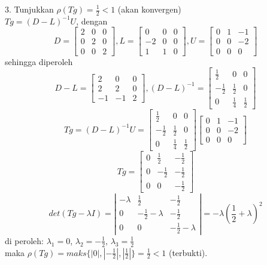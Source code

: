 \documentclass[paper=a4, fontsize=11pt]{scrartcl}
\numberwithin{equation}{section} %
\numberwithin{figure}{section} %
\numberwithin{table}{section} %
\begin{document}
3. Tunjukkan $\rho(Tg) = \frac{1}{2} < 1$ (akan konvergen)\\
$Tg = (D-L)^{-1}U$, dengan\\
\[ 
D = 
\begin{bmatrix}
  2 & 0 & 0 \\
  0 & 2 & 0 \\
  0 & 0 & 2
 \end{bmatrix}
,
L = 
\begin{bmatrix}
  0 & 0 & 0 \\
 -2 & 0 & 0 \\
  1 & 1 & 0
 \end{bmatrix}
, 
U = 
\begin{bmatrix}
  0 & 1 & -1 \\
  0 & 0 & -2 \\
  0 & 0 &  0
 \end{bmatrix}
\]
sehingga diperoleh
\[
D-L =
\begin{bmatrix}
  2 & 0 & 0 \\
  2 & 2 & 0 \\
  -1 & -1 & 2
 \end{bmatrix}
,
(D-L)^{-1} =
\begin{bmatrix}
  \frac{1}{2} & 0 & 0 \\
  -\frac{1}{2} & \frac{1}{2} & 0 \\
  0 & \frac{1}{4} & \frac{1}{2}
 \end{bmatrix}
\]
\[
Tg = (D-L)^{-1}U = 
\begin{bmatrix}
  \frac{1}{2} & 0 & 0 \\
  -\frac{1}{2} & \frac{1}{2} & 0 \\
  0 & \frac{1}{4} & \frac{1}{2}
 \end{bmatrix}
\begin{bmatrix}
  0 & 1 & -1 \\
  0 & 0 & -2 \\
  0 & 0 &  0
 \end{bmatrix}
\]
\[
Tg = 
\begin{bmatrix}
  0 & \frac{1}{2} & -\frac{1}{2} \\
  0 & -\frac{1}{2} & -\frac{1}{2} \\
  0 & 0 & -\frac{1}{2}
\end{bmatrix}
\]
\[
det(Tg - \lambda I) =
\left| 
\begin{array}{ccc}
  -\lambda & \frac{1}{2} & -\frac{1}{2} \\
  0 & -\frac{1}{2}-\lambda & -\frac{1}{2} \\
  0 & 0 & -\frac{1}{2}-\lambda
\end{array} 
\right|
= -\lambda(\frac{1}{2} + \lambda)^{2} 
\]
di peroleh: $\lambda_{1} = 0$, $\lambda_{2} = -\frac{1}{2}$, $\lambda_{3} = \frac{1}{2}$\\
maka $\rho(Tg) = maks\lbrace \left| 0 \right|, \left| -\frac{1}{2} \right|, \left| \frac{1}{2} \right| \rbrace = \frac{1}{2} < 1 $ (terbukti).\\
\end{document}
